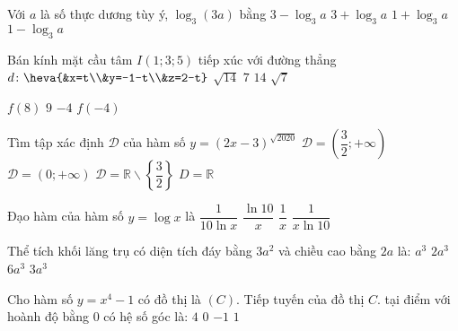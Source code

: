 \begin{ex}%
Với $a$ là số thực dương tùy ý, $\log_3(3 a)$ bằng
\choice
{$3-\log_3 a$}
{$3+\log_3 a$}
{\True $1+\log_3 a$}
{$1-\log_3 a$}

\end{ex}
\begin{ex}%
Bán kính mặt cầu tâm $I(1; 3; 5)$ tiếp xúc với đường thẳng\\ $d\colon\heva{&x=t\\&y=-1-t\\&z=2-t}$
\choice
{\True $\sqrt{14}$}
{$7$}
{$14$}
{$\sqrt{7}$}
\end{ex}
\begin{ex}%
{
}
\choice
{\True $f(8)$}
{$9$}
{$-4$}
{$f(-4)$}

\end{ex}
\begin{ex}%
Tìm tập xác định $\mathscr{D}$ của hàm số $y=(2 x-3)^{\sqrt{2020}}$ 
\choice
{$\mathscr{D}=\left(\dfrac{3}{2};+\infty\right)$}
{$\mathscr{D}=(0;+\infty)$}
{$\mathscr{D}=\mathbb{R} \backslash\left\{\dfrac{3}{2}\right\}$}
{\True $D=\mathbb{R}$}

\end{ex}
\begin{ex}%
Đạo hàm của hàm số $y=\log x$ là
\choice
{$\dfrac{1}{10\ln x}$}
{$\dfrac{\ln 10}{x}$}
{$\dfrac{1}{x}$}
{\True $\dfrac{1}{x \ln 10}$}

\end{ex}
\begin{ex}%
Thể tích khối lăng trụ có diện tích đáy bằng $3 a^2$ và chiều cao bằng $2 a$ là:
\choice
{$a^3$}
{$2 a^3$}
{\True $6 a^3$}
{$3 a^3$}

\end{ex}
\begin{ex}%
Cho hàm số $y=x^4-1$ có đồ thị là $(C)$. Tiếp tuyến của đồ thị $C.$ tại điểm với hoành độ bằng $0$ có hệ số góc là:
\choice
{$4$}
{\True $0$}
{$-1$}
{$1$}

\end{ex}
